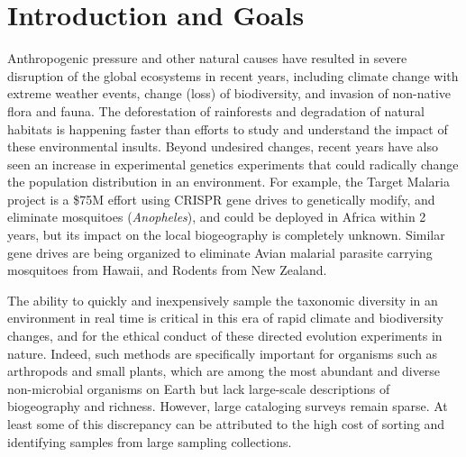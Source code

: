 \section{Introduction and Goals}
Anthropogenic pressure and other natural causes have resulted in
severe disruption of the global ecosystems in recent years, including
climate change with extreme weather events, change (loss) of
biodiversity, and invasion of non-native flora and fauna. The deforestation of
rainforests and degradation of natural habitats is happening faster
than efforts to study and understand the impact of these environmental
insults.  Beyond undesired changes, recent years have also seen an increase in experimental genetics
experiments that could radically change the
population distribution in an environment. For example, the Target Malaria project
is a \$75M effort using CRISPR gene drives to genetically modify, and
eliminate mosquitoes (\emph{Anopheles}), and could be deployed in
Africa within 2 years\cite{TargetMalaria}, but its impact on the local
biogeography is completely unknown.  Similar gene drives are being
organized to eliminate Avian malarial parasite carrying mosquitoes
from Hawaii\cite{Liao2017}, and Rodents from New Zealand\cite{Owens2017}.  

The ability
to quickly and inexpensively sample the taxonomic diversity in an
environment in real time is critical in this era of rapid climate and biodiversity
changes, and for the ethical
conduct of these directed evolution experiments in nature\cite{Oye2014}. Indeed, such methods are specifically important for organisms such as arthropods\cite{Beng2016} and small plants, which are among the most abundant and diverse
non-microbial organisms on Earth but lack large-scale descriptions of
biogeography and richness. However, large
cataloging surveys remain sparse. At least some of this discrepancy
can be attributed to the high cost of sorting and identifying samples
from large sampling collections. 

